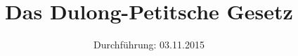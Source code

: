 

\subject{Versuchsprotokoll zum Versuch Nr. 201}
\title{Das Dulong-Petitsche Gesetz}
\date{
  Durchführung: 03.11.2015
}



\maketitle
\thispagestyle{empty}
\newpage






\printbibliography


